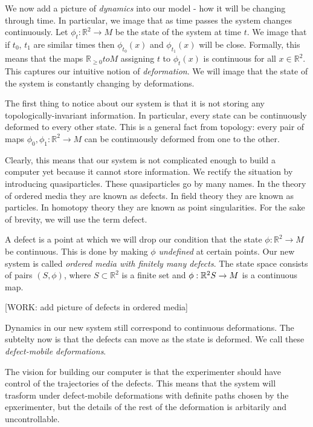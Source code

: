 \documentclass{article}
\theoremstyle{definition}
\newcommand{\RR}{\mathbb{R}}
\newcommand{\0}{\left|0\right>}
\newcommand{\1}{\left|1\right>}
\numberwithin{figure}{section}
\begin{document}
We now add a picture of \textit{dynamics} into our model - how it will be changing through time. In particular, we image that as time passes the system changes continuously. Let $\phi_t:\RR^2\to M$ be the state of the system at time $t$. We image that if $t_0$, $t_1$ are similar times then $\phi_{t_0}(x)$ and $\phi_{t_1}(x)$ will be close. Formally, this means that the maps $\RR_{\geq 0}to M$ assigning $t$ to $\phi_t(x)$ is continuous for all $x\in \RR^2$. This captures our intuitive notion of \textit{deformation}. We will image that the state of the system is constantly changing by deformations.

The first thing to notice about our system is that it is not storing any topologically-invariant information. In particular, every state can be continuously deformed to every other state. This is a general fact from topology: every pair of maps $\phi_0,\phi_1: \RR^2\to M$ can be continuously deformed from one to the other.

Clearly, this means that our system is not complicated enough to build a computer yet because it cannot store information. We rectify the situation by introducing quasiparticles. These quasiparticles go by many names. In the theory of ordered media they are known as defects. In field theory they are known as particles. In homotopy theory they are known as point singularities. For the sake of brevity, we will use the term defect.

A defect is a point at which we will drop our condition that the state $\phi:\RR^2\to M$ be continuous. This is done by making $\phi$ \textit{undefined} at certain points. Our new system is called \textit{ordered media with finitely many defects}. The state space consists of pairs $(S,\phi)$, where $S\subset \RR^2$ is a finite set and $\phi: \RR^2\\ S\to M$ is a continuous map.

[WORK: add picture of defects in ordered media]

Dynamics in our new system still correspond to continuous deformations. The subtelty now is that the defects can move as the state is deformed. We call these \textit{defect-mobile deformations}.

The vision for building our computer is that the experimenter should have control of the trajectories of the defects. This means that the system will trasform under defect-mobile deformations with definite paths chosen by the epxerimenter, but the details of the rest of the deformation is arbitarily and uncontrollable.
\end{document}
